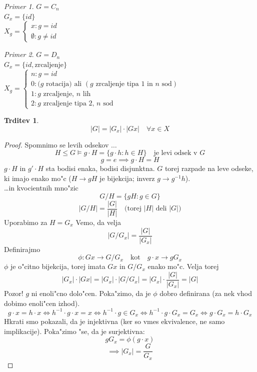 \documentclass[a4paper,12pt]{article}
\theoremstyle{definition}
\newtheorem{claim}[counter]{Trditev}
\theoremstyle{remark}
\newtheorem*{ex}{Primer}
\begin{document}
\begin{ex}
	$G = C_n$\\
	$G_x = \lbrace id \rbrace$\\
	$X_g = \begin{cases}x: g = id\\\emptyset: g\neq id\end{cases}$
\end{ex}
\begin{ex}
	$G = D_n$\\
	$G_x = \lbrace id, \text{zrcaljenje} \rbrace$\\
	$X_g = \begin{cases}n: g = id\\ 0: (g \text{ rotacija) ali }(g\text{ zrcaljenje tipa 1 in }n\text{ sod}) \\ 1: g \text{ zrcaljenje, }n\text{ lih} \\ 2: g \text{ zrcaljenje tipa 2, }n\text{ sod}\end{cases}$
\end{ex}

\begin{claim}
	$$|G| = |G_x| \cdot |Gx| \quad \forall x \in X$$
\end{claim}
\begin{proof}
	Spomnimo se levih odsekov $\ldots$
	$$ H \leq G \models g \cdot H = \lbrace g \cdot h : h \in H \rbrace \quad \text{je levi odsek v }G $$
	$$g = e \implies g \cdot H = H$$
	$g \cdot H$ in $g' \cdot H$ sta bodisi enaka, bodisi disjunktna.
	$G$ torej razpade na leve odseke, ki imajo enako mo"c ($H \rightarrow gH$ je bijekcija; inverz $g \rightarrow g^{-1}h$).
	\\
	\ldots in kvocientnih mno"zic
	$$G/H = \lbrace gH: g \in G \rbrace$$
	$$|G/H| = \frac{|G|}{|H|} \quad \text{(torej } |H| \text{ deli } |G|\text{)} $$
	Uporabimo za $H=G_x$
	Vemo, da velja $$|G/G_x| = \frac{|G|}{|G_x|}$$
	Definirajmo $$\phi: Gx \rightarrow G/G_x \quad \text{kot} \quad g \cdot x \rightarrow gG_x$$
	$\phi$ je o"citno bijekcija, torej imata $Gx$ in $G/G_x$ enako mo"c.
	Velja torej
	$$|G_x|\cdot|Gx| = |G_x| \cdot |G/G_x| = |G_x| \cdot \frac{|G|}{|G_x|} = |G| $$
	Pozor! $g$ ni enoli"cno dolo"cen. Poka"zimo, da je $\phi$ dobro definirana (za nek vhod dobimo enoli"cen izhod).
	$$g \cdot x = h \cdot x \iff h^{-1} \cdot g \cdot x = x \iff h^{-1} \cdot g \in G_x \iff h^{-1} \cdot g \cdot G_x = G_x \iff g \cdot G_x = h \cdot G_x $$
	Hkrati smo pokazali, da je injektivna (ker so vmes ekvivalence, ne samo implikacije).
	Poka"zimo "se, da je surjektivna:
	$$gG_x = \phi (g \cdot x) $$
	$$\implies |G_x| = \frac{G}{G_x}$$
\end{proof}
\end{document}
